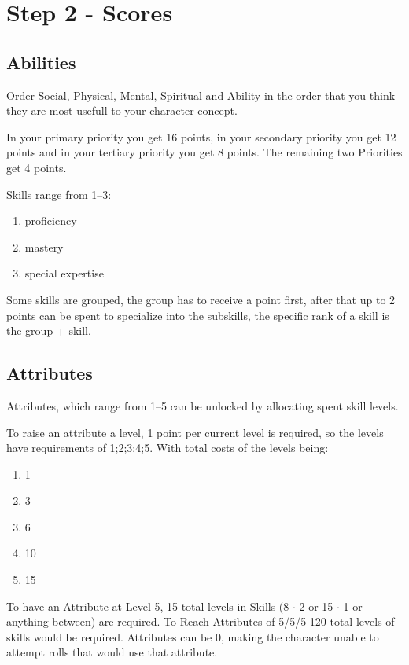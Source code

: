 \documentclass[a4paper]{book}
\begin{document}
    \section{Step 2 - Scores}\label{sec:step2-scores}
    \subsection{Abilities}\label{subsec:abilities}
    Order Social, Physical, Mental, Spiritual and Ability in the order that you think they are most
    usefull to your character concept. \par
    In your primary priority you get 16 points, in your secondary priority you get 12 points and in your tertiary
    priority you get 8 points.
    The remaining two Priorities get 4 points.\par
    Skills range from 1--3:
    \begin{enumerate}
        \item proficiency
        \item mastery
        \item special expertise
    \end{enumerate}
    Some skills are grouped, the group has to receive a point first, after that up to 2 points can be spent to
    specialize into the subskills, the specific rank of a skill is the group + skill.

    \subsection{Attributes}\label{subsec:attributes}
    Attributes, which range from 1--5 can be unlocked by allocating spent skill levels.\par
    To raise an attribute a level, 1 point per current level is required, so the levels have requirements of 1;2;3;4;5.
    With total costs of the levels being:\par
    \begin{enumerate}
        \item 1
        \item 3
        \item 6
        \item 10
        \item 15
    \end{enumerate}
    To have an Attribute at Level 5, 15 total levels in Skills (8 $\cdot$ 2 or 15 $\cdot$ 1 or anything between) are
    required.
    To Reach Attributes of 5/5/5 120 total levels of skills would be required.
    Attributes can be 0, making the character unable to attempt rolls that would use that attribute.
\end{document}
